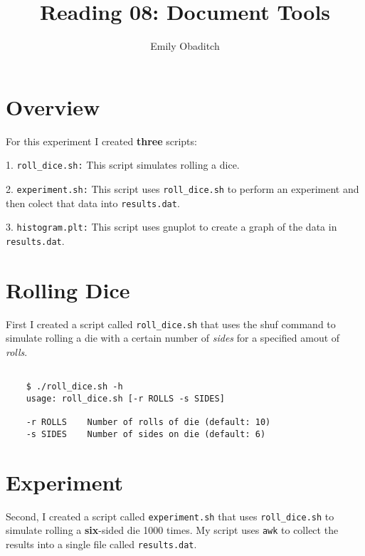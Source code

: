 \documentclass[letterpaper]{article}
\title{Reading 08: Document Tools}
\date{}
\author{Emily Obaditch}
\begin{document}
\maketitle


\section*{Overview}

For this experiment I created {\bf three} scripts: 

1. \verb|roll_dice.sh:| This script simulates rolling a dice. 

2. \verb|experiment.sh:| This script uses \verb|roll_dice.sh| to perform an experiment and then colect that data into \verb|results.dat|. 

3. \verb|histogram.plt:| This script uses gnuplot to create a graph of the data in \verb|results.dat|. 


\section*{Rolling Dice}

First I created a script called \verb|roll_dice.sh| that uses the shuf command to simulate rolling a die with a certain number of {\it sides} for a specified amout of {\it rolls}. 

\begin{verbatim}

    $ ./roll_dice.sh -h 
    usage: roll_dice.sh [-r ROLLS -s SIDES] 

    -r ROLLS    Number of rolls of die (default: 10)
    -s SIDES    Number of sides on die (default: 6)

\end{verbatim}


\section*{Experiment}

Second, I created a script called \verb|experiment.sh| that uses \verb|roll_dice.sh| to simulate rolling a {\bf six}-sided die 1000 times.  My script uses \verb|awk| to collect the results into a single file called \verb|results.dat|. 
\end{document}
